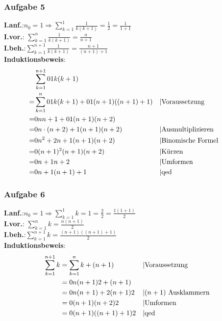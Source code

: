 \subsubsection{Aufgabe 5}
\textbf{I.anf.}:\quad$n_0 = 1 \Rightarrow \sum^1_{k=1} \frac{1}{k(k+1)} = \frac{1}{2} = \frac{1}{1+1}$\\
\textbf{I.vor.}: \quad$\sum^n_{k=1} \frac{1}{k(k+1)} = \frac{n}{n+1} $\\
\textbf{I.beh.}:\quad$\sum^{n+1}_{k=1} \frac{1}{k(k+1)} = \frac{n+1}{(n+1)+1} $\\
\textbf{Induktionsbeweis}:\begin{align*} 
&\sum^{n+1}_{k=1} \frac{1}{k(k+1)} \\
= &\sum^n_{k=1} \frac{1}{k(k+1)} + \frac{1}{(n+1)((n+1)+1)} && \text{\textbar Voraussetzung}\\
																	= &\frac{n}{n+1} + \frac{1}{(n+1)(n+2)} \\
																	= &\frac{n \cdot (n+2) +1}{(n+1)(n+2)} && \text{\textbar Ausmultiplizieren}\\
																	= &\frac{n^2 + 2n + 1}{(n+1)(n+2)} && \text{\textbar Binomische Formel}\\
																	= &\frac{(n+1)^2}{(n+1)(n+2)} && \text{\textbar Kürzen}\\
																	= &\frac{n+1}{n+2}						&& \text{\textbar Umformen}\\
																	= &\frac{n+1}{(n+1)+1} 				&& \text{\textbar qed}\end{align*}
\subsubsection{Aufgabe 6}
\textbf{I.anf.}:\quad$ n_0 = 1 \Rightarrow \sum^1_{k=1} k = 1 = \frac{2}{2} = \frac{1(1+1)}{2}$\\
\textbf{I.vor.}: \quad$\sum^n_{k=1} k = \frac{n(n+1)}{2}$ \\
\textbf{I.beh.}:\quad$\sum^{n+1}_{k=1} k = \frac{(n+1)((n+1)+1)}{2} $\\
\textbf{Induktionsbeweis}: \begin{align*}
\sum^{n+1}_{k=1} k &= \sum^n_{k=1} k + (n+1) && \text{\textbar Voraussetzung}\\
										&= \frac{n(n+1)}{2} + (n+1)\\
										&= \frac{n(n+1) + 2(n+1)}{2} && \text{\textbar $(n+1)$ Ausklammern}\\
										&= \frac{(n+1)(n + 2)}{2} && \text{\textbar Umformen}\\
										&= \frac{(n+1)((n+1)+1)}{2} && \text{\textbar qed} \end{align*}	
